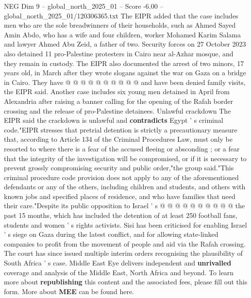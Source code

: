 \begin{textsample}{NEG Dim 9 – global\_north\_2025\_01 – Score -6.00 – global\_north\_2025\_01/120306365.txt}
The EIPR added that the case includes men who are the sole breadwinners of their households, such as Ahmed Sayed Amin Abdo, who has a wife and four children, worker Mohamed Karim Salama and lawyer Ahmed Abu Zeid, a father of two.
Security forces on 27 October 2023 also detained 11 pro-Palestine protesters in Cairo near al-Azhar mosque, and they remain in custody.
The EIPR also documented the arrest of two minors, 17 years old, in March after they wrote slogans against the war on Gaza on a bridge in Cairo.
They have @ @ @ @ @ @ @ @ @ @ and have been denied family visits, the EIPR said.
Another case includes six young men detained in April from Alexandria after raising a banner calling for the opening of the Rafah border crossing and the release of pro-Palestine detainees.
Unlawful crackdown The EIPR said the crackdown is unlawful and \textbf{contradicts} Egypt ' s criminal code."EIPR stresses that pretrial detention is strictly a precautionary measure that, according to Article 134 of the Criminal Procedures Law, must only be resorted to where there is a fear of the accused fleeing or absconding ; or a fear that the integrity of the investigation will be compromised, or if it is necessary to prevent grossly compromising security and public order,"the group said."This criminal procedure code provision does not apply to any of the aforementioned defendants or any of the others, including children and students, and others with known jobs and specified places of residence, and who have families that need their care."Despite its public opposition to Israel ' s @ @ @ @ @ @ @ @ @ @ the past 15 months, which has included the detention of at least 250 football fans, students and women ' s rights activists.
Sisi has been criticised for enabling Israel ' s siege on Gaza during the latest conflict, and for allowing state-linked companies to profit from the movement of people and aid via the Rafah crossing.
The court has since issued multiple interim orders recognising the plausibility of South Africa ' s case.
Middle East Eye delivers independent and \textbf{unrivalled} coverage and analysis of the Middle East, North Africa and beyond.
To learn more about \textbf{republishing} this content and the associated fees, please fill out this form.
More about \textbf{MEE} can be found here.

\end{textsample}
